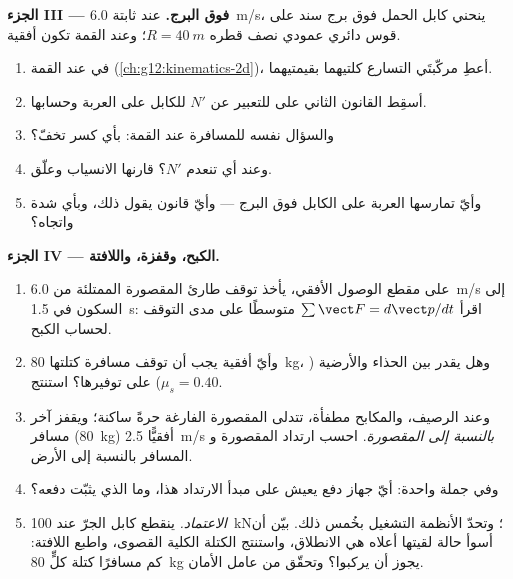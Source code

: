 \begin{problem}
\medskip
\noindent\textbf{الجزء III --- فوق البرج.} عند  ثابتة \qty{6.0}{m/s}، ينحني
كابل الحمل فوق برج سند على قوس دائري عمودي نصف قطره
$R = \qty{40}{m}$؛ وعند القمة تكون  أفقية.
\begin{enumerate}[resume]
  \item في  عند القمة (\cref{ch:g12:kinematics-2d})، أعطِ مركّبتَي
        التسارع كلتيهما بقيمتيهما.
  \item أسقِط القانون الثاني على  للتعبير عن 
        $N'$ للكابل على العربة وحسابها.
  \item والسؤال نفسه  للمسافرة عند القمة: بأي كسر
        تخفّ؟
  \item وعند أي  تنعدم $N'$؟ قارنها  الانسياب وعلّق.
  \item وأيّ  تمارسها العربة على الكابل فوق البرج --- وأيّ قانون
        يقول ذلك، وبأي شدة واتجاه؟
\end{enumerate}

\medskip
\noindent\textbf{الجزء IV --- الكبح، وقفزة، واللافتة.}
\begin{enumerate}[resume]
  \item على مقطع الوصول الأفقي، يأخذ توقف طارئ المقصورة الممتلئة
        من \qty{6.0}{m/s} إلى السكون في \qty{1.5}{s}: اقرأ $\sum \vect F = d\vect p/dt$
        متوسطًا على مدى التوقف لحساب  الكبح.
  \item وأيّ  أفقية يجب أن توقف مسافرة كتلتها \qty{80}{kg}، وهل يقدر
         بين الحذاء والأرضية ($\mu_s = 0.40$) على توفيرها؟ استنتج.
  \item وعند الرصيف، والمكابح مطفأة، تتدلى المقصورة الفارغة حرةً ساكنة؛ ويقفز آخر
        مسافر (\qty{80}{kg}) أفقيًّا  \qty{2.5}{m/s}
        \emph{بالنسبة إلى المقصورة}. احسب  ارتداد المقصورة و
         المسافر بالنسبة إلى الأرض.
  \item وفي جملة واحدة: أيّ جهاز دفع يعيش على مبدأ الارتداد هذا،
        وما الذي يثبّت  دفعه؟
  \item \emph{الاعتماد.} ينقطع كابل الجرّ عند \qty{100}{kN}؛ وتحدّ الأنظمة
         التشغيل بخُمس ذلك. بيّن أن أسوأ حالة لقيتها أعلاه
        هي الانطلاق، واستنتج الكتلة الكلية القصوى، واطبع اللافتة: كم
        مسافرًا كتلة كلٍّ \qty{80}{kg} يجوز أن يركبوا؟ وتحقّق من عامل الأمان.
\end{enumerate}
\end{problem}

